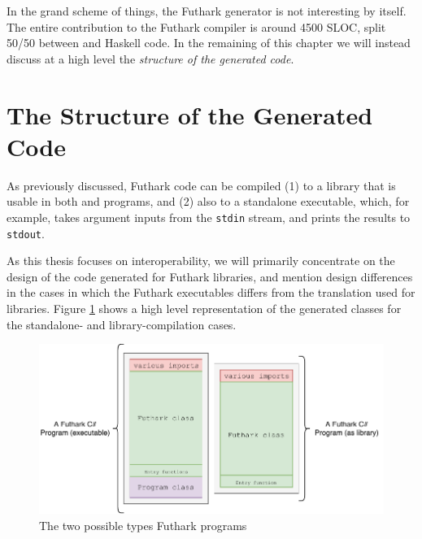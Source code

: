 In the grand scheme of things, the Futhark \csharp{} generator is not
interesting by itself. The entire contribution to the Futhark compiler is
around 4500 SLOC, split 50/50 between \csharp{} and Haskell code.
In the remaining of this chapter we will instead discuss at a high level
the {\em structure of the generated code}.


\section{The Structure of the Generated \csharp{} Code}
As previously discussed, Futhark code can be compiled (1) to a library 
that is usable in both \csharp{} and \fsharp{} programs, and (2) also
to a standalone \csharp{} executable, which, for example, takes argument 
inputs from the \texttt{stdin} stream, and prints the
results to \texttt{stdout}.

As this thesis focuses on interoperability, we will primarily concentrate on the
design of the \csharp{} code generated for Futhark libraries, and mention
design differences in the cases in which the Futhark executables differs 
from the translation used for libraries.
Figure \ref{fig:futharkcsclasses} shows a high level representation of the
generated \csharp{} classes for the standalone- and library-compilation cases.

\begin{figure}[h]
  \centering
  \includegraphics[scale=0.85]{chapters/figs/csharp/futharkcs_wide.pdf}
  \caption{The two possible types Futhark \csharp{} programs}
  \label{fig:futharkcsclasses}
\end{figure}


